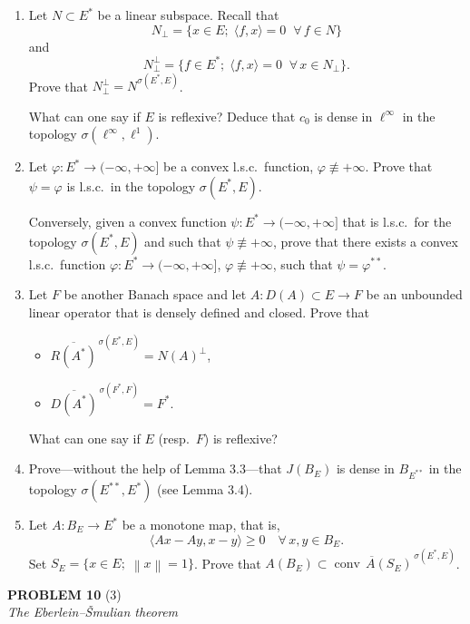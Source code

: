 \documentclass[12pt]{article}
\newcommand{\norm}[1]{\left\|#1\right\|}
\newcommand{\ip}[2]{\langle #1, #2 \rangle}
\begin{document}
\begin{enumerate}
\item Let $N \subset E^*$ be a linear subspace. Recall that
\[
N_\perp = \{x \in E;\; \ip{f}{x} = 0\;\;\forall\, f \in N\}
\]
and
\[
N_\perp^\perp = \{f \in E^*;\; \ip{f}{x} = 0\;\;\forall\, x \in N_\perp\}.
\]
Prove that $N_\perp^\perp = N^{\sigma(E^*,E)}$.

What can one say if $E$ is reflexive?
Deduce that $c_0$ is dense in $\ell^\infty$ in the topology $\sigma(\ell^\infty, \ell^1)$.

\item Let $\varphi : E^* \to (-\infty,+\infty]$ be a convex l.s.c.\ function, $\varphi \not\equiv +\infty$.
Prove that $\psi = \varphi$ is l.s.c.\ in the topology $\sigma(E^*, E)$.

Conversely, given a convex function $\psi : E^* \to (-\infty,+\infty]$ that is l.s.c.\ for the
topology $\sigma(E^*, E)$ and such that $\psi \not\equiv +\infty$, prove that there exists a convex
l.s.c.\ function $\varphi : E^* \to (-\infty,+\infty]$, $\varphi \not\equiv +\infty$, such that $\psi = \varphi^{**}$.

\item Let $F$ be another Banach space and let $A : D(A) \subset E \to F$ be an unbounded
linear operator that is densely defined and closed. Prove that
\begin{itemize}
    \item[(i)] $\overline{R(A^*)}^{\,\sigma(E^*,E)} = N(A)^\perp$,
    \item[(ii)] $\overline{D(A^*)}^{\,\sigma(F^*,F)} = F^*$.
\end{itemize}
What can one say if $E$ (resp.\ $F$) is reflexive?

\item Prove---without the help of Lemma 3.3---that $J(B_E)$ is dense in $B_{E^{**}}$ in the
topology $\sigma(E^{**}, E^*)$ (see Lemma 3.4).

\item Let $A : B_E \to E^*$ be a monotone map, that is,
\[
\ip{Ax - Ay}{x-y} \ge 0 \quad \forall\, x, y \in B_E.
\]
Set $S_E = \{x \in E;\; \norm{x} = 1\}$. Prove that $A(B_E) \subset \overline{\operatorname{conv}\, A(S_E)}^{\,\sigma(E^*,E)}$.
\end{enumerate}

\bigskip

\noindent\textbf{PROBLEM 10} (3)\\[4pt]
\textit{The Eberlein--\v{S}mulian theorem}
\end{document}
